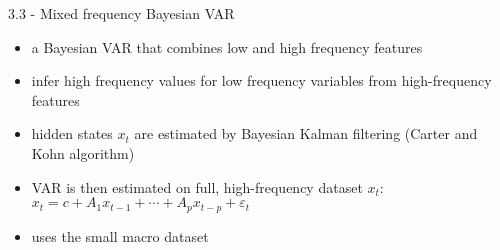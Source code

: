 \begin{frame}{3.3 - Mixed frequency Bayesian VAR}
\begin{itemize}
	\item a Bayesian VAR that combines low and high frequency features \vspace{1mm}
	\item infer high frequency values for low frequency variables from high-frequency features \vspace{1mm}
	\item hidden states $x_t$ are estimated by Bayesian Kalman filtering (Carter and Kohn algorithm) \vspace{1mm}
	\item VAR is then estimated on full, high-frequency dataset $x_t$: \\ \vspace{1mm}
	$x_t = c + A_1 x_{t-1} + \cdots + A_p x_{t-p} + \varepsilon_t$ \vspace{1mm}
	\item uses the small macro dataset
\end{itemize}
\end{frame}